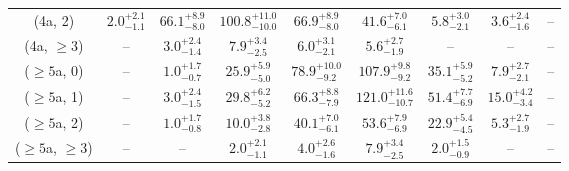 \begin{table}[h!]
{\begin{tabular}{ccccccccc}
	(4a, 2) & $2.0^{+ 2.1 }_{- 1.1 }$ & $66.1^{+ 8.9 }_{- 8.0 }$ & $100.8^{+ 11.0 }_{- 10.0 }$ & $66.9^{+ 8.9 }_{- 8.0 }$ & $41.6^{+ 7.0 }_{- 6.1 }$ & $5.8^{+ 3.0 }_{- 2.1 }$ & $3.6^{+ 2.4 }_{- 1.6 }$ & -- \\[0.5ex] 
	(4a, $\ge3$) & -- & $3.0^{+ 2.4 }_{- 1.4 }$ & $7.9^{+ 3.4 }_{- 2.5 }$ & $6.0^{+ 3.1 }_{- 2.1 }$ & $5.6^{+ 2.7 }_{- 1.9 }$ & -- & -- & -- \\[0.5ex] 
	($\ge5$a, 0) & -- & $1.0^{+ 1.7 }_{- 0.7 }$ & $25.9^{+ 5.9 }_{- 5.0 }$ & $78.9^{+ 10.0 }_{- 9.2 }$ & $107.9^{+ 9.8 }_{- 9.2 }$ & $35.1^{+ 5.9 }_{- 5.2 }$ & $7.9^{+ 2.7 }_{- 2.1 }$ & -- \\[0.5ex] 
	($\ge5$a, 1) & -- & $3.0^{+ 2.4 }_{- 1.5 }$ & $29.8^{+ 6.2 }_{- 5.2 }$ & $66.3^{+ 8.8 }_{- 7.9 }$ & $121.0^{+ 11.6 }_{- 10.7 }$ & $51.4^{+ 7.7 }_{- 6.9 }$ & $15.0^{+ 4.2 }_{- 3.4 }$ & -- \\[0.5ex] 
	($\ge5$a, 2) & -- & $1.0^{+ 1.7 }_{- 0.8 }$ & $10.0^{+ 3.8 }_{- 2.8 }$ & $40.1^{+ 7.0 }_{- 6.1 }$ & $53.6^{+ 7.9 }_{- 6.9 }$ & $22.9^{+ 5.4 }_{- 4.5 }$ & $5.3^{+ 2.7 }_{- 1.9 }$ & -- \\[0.5ex] 
	($\ge5$a, $\ge3$) & -- & -- & $2.0^{+ 2.1 }_{- 1.1 }$ & $4.0^{+ 2.6 }_{- 1.6 }$ & $7.9^{+ 3.4 }_{- 2.5 }$ & $2.0^{+ 1.5 }_{- 0.9 }$ & -- & -- \\[0.5ex] 
	\hline
	\hline
\end{tabular}}
\end{table}
